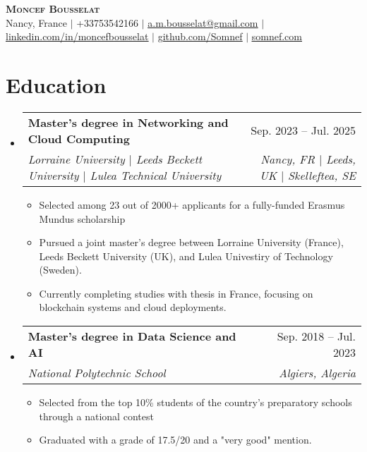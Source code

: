\documentclass[letterpaper,10.5t]{article}
\makeatletter
\newcommand{\resumeItem}[1]{
  \item\small{
    {#1 \vspace{-2pt}}
  }
}
\newcommand{\resumeSubheading}[4]{
  \vspace{-2pt}\item
    \begin{tabular*}{0.97\textwidth}[t]{l@{\extracolsep{\fill}}r}
      \textbf{#1} & #2 \\
      \textit{\small#3} & \textit{\small #4} \\
    \end{tabular*}\vspace{-7pt}
}
\newcommand{\resumeSubHeadingListStart}{\begin{itemize}[leftmargin=0.15in, label={}]}
\newcommand{\resumeSubHeadingListEnd}{\end{itemize}}
\newcommand{\resumeItemListStart}{\begin{itemize}}
\newcommand{\resumeItemListEnd}{\end{itemize}\vspace{-5pt}}
\makeatother
\begin{document}

\begin{center}
    \textbf{\Huge \scshape Moncef Bousselat} \\ \vspace{1pt}
    \small Nancy, France $|$ 
    \small +33753542166 $|$ 
    \href{mailto:a.m.bousselat@gmail.com@gmail.com}{\underline{a.m.bousselat@gmail.com}} $|$ 
    \href{https://www.linkedin.com/in/moncefbousselat/}{\underline{linkedin.com/in/moncefbousselat}} $|$
    \href{https://github.com/Somnef}{\underline{github.com/Somnef}} $|$
    \href{https://www.somnef.com}{\underline{somnef.com}}
\end{center}


\section{Education}
    \resumeSubHeadingListStart
        \resumeSubheading
        {Master's degree in Networking and Cloud Computing}{Sep. 2023 -- Jul. 2025}
        {Lorraine University $|$ Leeds Beckett University $|$ Lulea Technical University}{Nancy, FR $|$ Leeds, UK $|$ Skelleftea, SE}
            \resumeItemListStart
                \resumeItem{Selected among 23 out of 2000+ applicants for a fully-funded Erasmus Mundus scholarship}
                \resumeItem{Pursued a joint master's degree between Lorraine University (France), Leeds Beckett University (UK), and Lulea Univestiry of Technology (Sweden).}
                \resumeItem{Currently completing studies with thesis in France, focusing on blockchain systems and cloud deployments.}
            \resumeItemListEnd
      
        \resumeSubheading
        {Master's degree in Data Science and AI}{Sep. 2018 -- Jul. 2023}
        {National Polytechnic School}{Algiers, Algeria}
            \resumeItemListStart
                \resumeItem{Selected from the top 10\% students of the country's preparatory schools through a national contest}
                \resumeItem{Graduated with a grade of 17.5/20 and a "very good" mention.}
            \resumeItemListEnd
  \resumeSubHeadingListEnd
\end{document}
